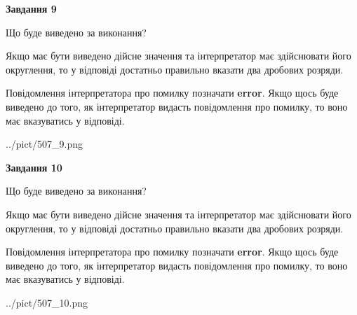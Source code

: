 \documentclass[12pt, ukrainian]{article}
\begin{document}
{\begin {Large}
{\begin {center}\textbf{Завдання 9}\end {center}}\par
Що буде виведено за виконання? \par

Якщо має бути виведено дійсне значення та інтерпретатор має здійснювати його округлення, 
то у відповіді достатньо правильно вказати два дробових розряди.

Повідомлення інтерпретатора про помилку позначати \textbf{error}.
Якщо щось буде виведено до того, як інтерпретатор видасть повідомлення про помилку, 
то воно має вказуватись у відповіді. \par

\begin{center}
	{../pict/507_9.png}
\end{center}
\newpage

{\begin {center}\textbf{Завдання 10}\end {center}}\par
Що буде виведено за виконання? \par

Якщо має бути виведено дійсне значення та інтерпретатор має здійснювати його округлення, 
то у відповіді достатньо правильно вказати два дробових розряди.

Повідомлення інтерпретатора про помилку позначати \textbf{error}.
Якщо щось буде виведено до того, як інтерпретатор видасть повідомлення про помилку, 
то воно має вказуватись у відповіді. \par

\begin{center}
	{../pict/507_10.png}
\end{center}
\newpage

\end {Large}}
\end{document}
